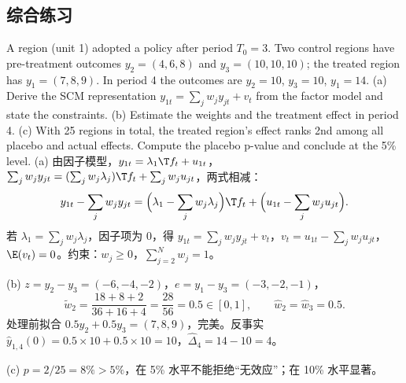\subsection{综合练习}

\begin{prac}
A region (unit 1) adopted a policy after period $T_0=3$. Two control regions have pre-treatment outcomes $y_2=(4,6,8)$ and $y_3=(10,10,10)$; the treated region has $y_1=(7,8,9)$. In period 4 the outcomes are $y_2=10$, $y_3=10$, $y_1=14$. (a) Derive the SCM representation $y_{1t}=\sum_jw_jy_{jt}+v_t$ from the factor model and state the constraints. (b) Estimate the weights and the treatment effect in period 4. (c) With 25 regions in total, the treated region's effect ranks 2nd among all placebo and actual effects. Compute the placebo p-value and conclude at the 5\% level.
\answer
(a) 由因子模型，$y_{1t}=\lambda_1\T f_t+u_{1t}$，$\sum_jw_jy_{jt}=(\sum_jw_j\lambda_j)\T f_t+\sum_jw_ju_{jt}$，两式相减：
\[
y_{1t}-\sum_jw_jy_{jt}=\Big(\lambda_1-\sum_jw_j\lambda_j\Big)\T f_t+\Big(u_{1t}-\sum_jw_ju_{jt}\Big).
\]
若 $\lambda_1=\sum_jw_j\lambda_j$，因子项为 0，得 $y_{1t}=\sum_jw_jy_{jt}+v_t$，$v_t=u_{1t}-\sum_jw_ju_{jt}$，$\E(v_t)=0$。约束：$w_j\ge0$，$\sum_{j=2}^Nw_j=1$。

(b) $z=y_2-y_3=(-6,-4,-2)$，$e=y_1-y_3=(-3,-2,-1)$，
\[
\tilde w_2=\frac{18+8+2}{36+16+4}=\frac{28}{56}=0.5\in[0,1],\qquad \hat w_2=\hat w_3=0.5 .
\]
处理前拟合 $0.5y_2+0.5y_3=(7,8,9)$，完美。反事实 $\hat y_{1,4}(0)=0.5\times10+0.5\times10=10$，$\hat\Delta_4=14-10=4$。

(c) $p=2/25=8\%>5\%$，在 5\% 水平不能拒绝“无效应”；在 10\% 水平显著。
\end{prac}

